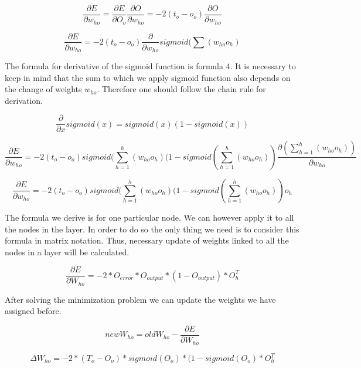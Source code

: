 \begin{equation}
\frac{\partial E}{\partial w_{ho}}=\frac{\partial E}{\partial O_{o}}\frac{\partial O}{\partial w_{ho}}=-2(t_o-o_o)\frac{\partial O}{\partial w_{ho}}
\end{equation}

\begin{equation}
\frac{\partial E}{\partial w_{ho}}=-2(t_o-o_o)\frac{\partial}{\partial w_{ho}}sigmoid(\sum(w_{ho}o_h)
\end{equation}

The formula for derivative of the sigmoid function is formula 4. It is necessary to keep in mind that the sum to which we apply sigmoid function also depends on the change of weights \(w_{ho}\). Therefore one should follow the chain rule for derivation.

\begin{equation}
\frac{\partial}{\partial x}sigmoid(x)=sigmoid(x)(1-sigmoid(x))
\end{equation}

\begin{equation}
\frac{\partial E}{\partial w_{ho}}=-2(t_o-o_o)sigmoid(\sum_{h=1}^{h} (w_{ho}o_h)(1-sigmoid(\sum_{h=1}^{h} (w_{ho}o_h))\frac{\partial (\sum_{h=1}^{h} (w_{ho}o_h))}{\partial w_{ho}}
\end{equation}

\begin{equation}
\frac{\partial E}{\partial w_{ho}}=-2(t_o-o_o)sigmoid(\sum_{h=1}^{h} (w_{ho}o_h)(1-sigmoid(\sum_{h=1}^{h} (w_{ho}o_h))o_h
\end{equation}

The formula we derive is for one particular node. We can however apply it to all the nodes in the layer. In order to do so the only thing we need is to consider this formula in matrix notation. Thus, necessary update of weights linked to all the nodes in a layer will be calculated.

\begin{equation}
\frac{\partial E}{\partial W_{ho}}=-2*O_{error}*O_{output}*(1-O_{output})*O_h^T
\end{equation}

After solving the minimization problem we can update the weights we have assigned before.

\begin{equation}
new W_{ho}=old W_{ho}-\frac{\partial E}{\partial W_{ho}}
\end{equation}

\begin{equation}
\Delta W_{ho}=-2*(T_o-O_o)*sigmoid(O_o)*(1-sigmoid(O_o)*O_h^T
\end{equation}

